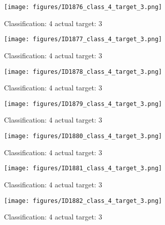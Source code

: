 \begin{figure}[h!]
\begin{center}
\texttt{[image: figures/ID1876\_class\_4\_target\_3.png]}
\end{center}
\caption{ Classification: 4 actual target: 3}
\label{fig:ID1876_class_4_target_3}
\end{figure}
\begin{figure}[h!]
\begin{center}
\texttt{[image: figures/ID1877\_class\_4\_target\_3.png]}
\end{center}
\caption{ Classification: 4 actual target: 3}
\label{fig:ID1877_class_4_target_3}
\end{figure}
\begin{figure}[h!]
\begin{center}
\texttt{[image: figures/ID1878\_class\_4\_target\_3.png]}
\end{center}
\caption{ Classification: 4 actual target: 3}
\label{fig:ID1878_class_4_target_3}
\end{figure}
\begin{figure}[h!]
\begin{center}
\texttt{[image: figures/ID1879\_class\_4\_target\_3.png]}
\end{center}
\caption{ Classification: 4 actual target: 3}
\label{fig:ID1879_class_4_target_3}
\end{figure}
\begin{figure}[h!]
\begin{center}
\texttt{[image: figures/ID1880\_class\_4\_target\_3.png]}
\end{center}
\caption{ Classification: 4 actual target: 3}
\label{fig:ID1880_class_4_target_3}
\end{figure}
\begin{figure}[h!]
\begin{center}
\texttt{[image: figures/ID1881\_class\_4\_target\_3.png]}
\end{center}
\caption{ Classification: 4 actual target: 3}
\label{fig:ID1881_class_4_target_3}
\end{figure}
\begin{figure}[h!]
\begin{center}
\texttt{[image: figures/ID1882\_class\_4\_target\_3.png]}
\end{center}
\caption{ Classification: 4 actual target: 3}
\label{fig:ID1882_class_4_target_3}
\end{figure}
